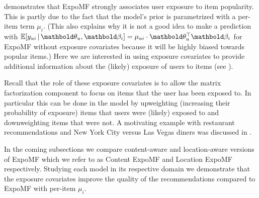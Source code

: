 
 demonstrates that ExpoMF strongly associates user exposure to item popularity. This is partly due to the fact that the
model's prior is parametrized with a per-item term $\mu_i$. 
(This also explains why it is not a good idea to make a prediction with $\mathbb{E}[y_{ui} \g \mb\theta_u, \mb\beta_i] = \mu_{ui} \cdot \mb\theta_u^\top\mb\beta_i$ for ExpoMF without exposure covariates because it will be highly biased towards popular items.)  
Here we are interested in using exposure covariates to provide additional
information about the (likely) exposure of users to items (see
). 

Recall that the role of these exposure covariates
is to allow the matrix factorization component to focus on items that the user has been exposed to. In particular this can be done
in the model by upweighting (increasing their probability of exposure)
items that users were (likely) exposed to and downweighting items that
were not. A motivating example with restaurant recommendations and New York
City versus Las Vegas diners was discussed in .



In the coming subsections we compare content-aware and location-aware
versions of ExpoMF which we refer to as Content ExpoMF and Location ExpoMF
respectively. Studying each model in its respective domain we demonstrate
that the exposure covariates improve the quality of the recommendations
compared to ExpoMF with per-item $\mu_i$.

